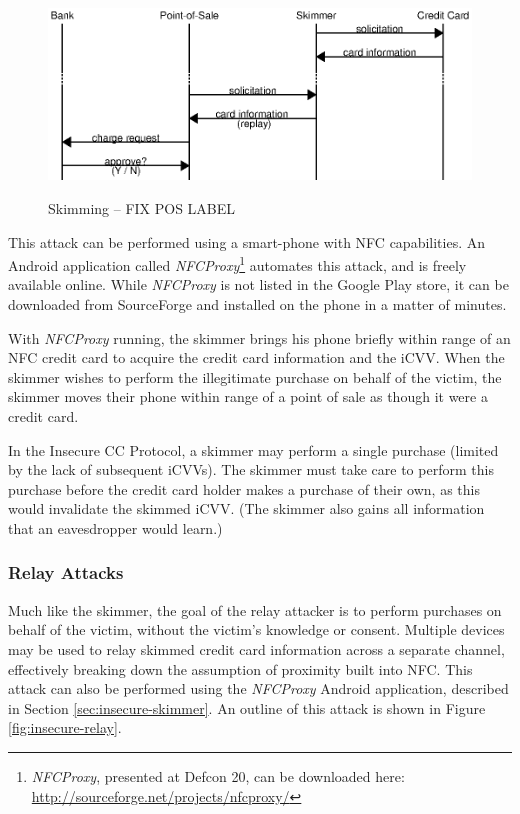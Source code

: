 \begin{figure}
  \caption{Skimming -- FIX POS LABEL}
  \centering
    \includegraphics{img/attack-3-skim.eps}
  \label{fig:insecure-skimmer}
\end{figure}

This attack can be performed using a smart-phone with NFC capabilities.
An Android application called \emph{NFCProxy}\footnote{\emph{NFCProxy}\cite{NFCProxy}, presented at Defcon 20, can be downloaded here: \url{http://sourceforge.net/projects/nfcproxy/}} automates this attack, and is freely available online.
While \emph{NFCProxy} is not listed in the Google Play store, it can be downloaded from SourceForge and installed on the phone in a matter of minutes.

With \emph{NFCProxy} running, the skimmer brings his phone briefly within range of an NFC credit card to acquire the credit card information and  the iCVV.
When the skimmer wishes to perform the illegitimate purchase on behalf of the victim, the skimmer moves their phone within range of a point of sale as though it were a credit card.

In the Insecure CC Protocol, a skimmer may perform a single purchase (limited by the lack of subsequent iCVVs).
The skimmer must take care to perform this purchase before the credit card holder makes a purchase of their own, as this would invalidate the skimmed iCVV.
(The skimmer also gains all information that an eavesdropper would learn.)






\subsubsection{Relay Attacks}
\label{sec:insecure-relay}

Much like the skimmer, the goal of the relay attacker is to perform purchases on behalf of the victim, without the victim's knowledge or consent.
Multiple devices may be used to relay skimmed credit card information across a separate channel, effectively breaking down the assumption of proximity built into NFC.
This attack can also be performed using the \emph{NFCProxy} Android application, described in Section \ref{sec:insecure-skimmer}.
An outline of this attack is shown in Figure \ref{fig:insecure-relay}.


